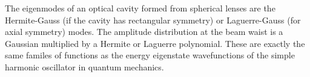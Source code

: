 The eigenmodes of an optical cavity formed from spherical lenses are
the Hermite-Gauss (if the cavity has rectangular symmetry) or
Laguerre-Gauss (for axial symmetry) modes.  The amplitude distribution
at the beam waist is a Gaussian multiplied by a Hermite or Laguerre
polynomial.  These are exactly the same familes of functions as the
energy eigenstate wavefunctions of the simple harmonic oscillator in
quantum mechanics.

